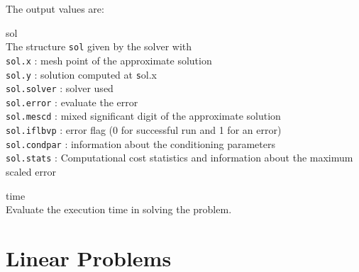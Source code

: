 \documentclass[<options>]{article}
\begin{document}
The output values are:
\begin{list}
{}{%
  \renewcommand\makelabel[1]{\texttt{#1}\hfill}
}
\item[sol]\ \\
The structure \texttt{sol}  given by the solver with\\
\texttt{sol.x} : mesh point of the approximate solution\\
\texttt{sol.y} : solution computed at \texttt sol.x \\
\texttt{sol.solver} : solver used\\
\texttt{sol.error} : evaluate the error\\
\texttt{sol.mescd} : mixed significant digit of the approximate solution\\
\texttt{sol.iflbvp} : error flag (0 for successful run and 1 for an error)\\
\texttt{sol.condpar} :  information about the conditioning parameters \\
\texttt{sol.stats} : Computational cost statistics and information about the
maximum scaled error \\
\item[time]\ \\
Evaluate the execution time in solving the problem.
\end{list}
\newpage
\section{Linear Problems}\label{Linear}
\end{document}
